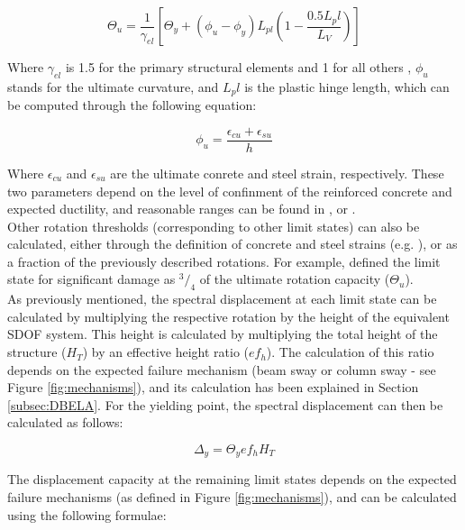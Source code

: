 \begin{equation}
\Theta_u = \frac{1}{\gamma_{el}}\left[\Theta_y + (\phi_u-\phi_y)L_{pl}\left(1-\frac{0.5L_pl}{L_V}\right)\right]
\end{equation}

Where $\gamma_{el}$ is 1.5 for the primary structural elements and 1 for all others \citep{BorziEtAl2008b}, $\phi_u$ stands for the ultimate curvature, and $L_pl$ is the plastic hinge length, which can be computed through the following equation:

\begin{equation}
\phi_u = \frac{\epsilon_{cu}+\epsilon_{su}}{h}
\end{equation}

Where $\epsilon_{cu}$ and $\epsilon_{su}$ are the ultimate conrete and steel strain, respectively. These two parameters depend on the level of confinment of the reinforced concrete and expected ductility, and reasonable ranges can be found in \cite{Calvi1999}, \cite{CrowleyEtAl2004} or \cite{BalEtAl2010}.\\

Other rotation thresholds (corresponding to other limit states) can also be calculated, either through the definition of concrete and steel strains (e.g. \cite{CrowleyEtAl2004}), or as a fraction of the previously described rotations. For example, \cite{BorziEtAl2008b} defined the limit state for significant damage as $^3/_4$ of the ultimate rotation capacity ($\Theta_u$).\\

As previously mentioned, the spectral displacement at each limit state can be calculated by multiplying the respective rotation by the height of the equivalent SDOF system. This height is calculated by multiplying the total height of the structure ($H_T$) by an effective height ratio ($ef_h$). The calculation of this ratio depends on the expected failure mechanism (beam sway or column sway - see Figure \ref{fig:mechanisms}), and its calculation has been explained in Section \ref{subsec:DBELA}. For the yielding point, the spectral displacement can then be calculated as follows:

\begin{equation}
\Delta_y = \Theta_yef_hH_T
\end{equation}

The displacement capacity at the remaining limit states depends on the expected failure mechanisms (as defined in Figure \ref{fig:mechanisms}), and can be calculated using the following formulae:\\

